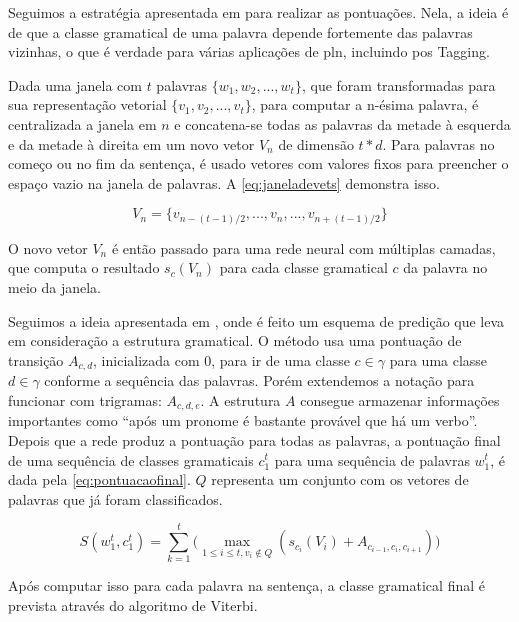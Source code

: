 Seguimos a estratégia apresentada em \cite{dos2014training} para realizar as pontuações. Nela, a ideia é de que a classe gramatical de uma palavra depende fortemente das palavras vizinhas, o que é verdade para várias aplicações de \ac{pln}, incluindo \ac{pos} Tagging.

Dada uma janela com $t$ palavras $\{w_1, w_2, ..., w_t\}$, que foram transformadas para sua representação vetorial $\{v_1, v_2, ..., v_t\}$, para computar a n-ésima palavra, é centralizada a janela em $n$ e concatena-se todas as palavras da metade à esquerda e da metade à direita em um novo vetor $V_n$ de dimensão $t * d$. Para palavras no começo ou no fim da sentença, é usado vetores com valores fixos para preencher o espaço vazio na janela de palavras. A \autoref{eq:janeladevets} demonstra isso.

\begin{equation} \label{eq:janeladevets}
V_n = \big\{ v_{n - (t-1)/2}, ..., v_n, ..., v_{{n + (t-1)/2}} \big\}
\end{equation}

O novo vetor $V_n$ é então passado para uma rede neural com múltiplas camadas, que computa o resultado $s_c(V_n)$ para cada classe gramatical $c$ da palavra no meio da janela. 

Seguimos a ideia apresentada em \cite{collobert2011natural}, onde é feito um esquema de predição que leva em consideração a estrutura gramatical. O método usa uma pontuação de transição $A_{c,d}$, inicializada com 0, para ir de uma classe $c \in \gamma$ para uma classe $d \in \gamma$ conforme a sequência das palavras. Porém extendemos a notação para funcionar com trigramas: $A_{c,d,e}$. A estrutura $A$ consegue armazenar informações importantes como ``após um pronome é bastante provável que há um verbo''. Depois que a rede produz a pontuação para todas as palavras, a pontuação final de uma sequência de classes gramaticais $c_1^t$ para uma sequência de palavras $w_1^t$, é dada pela \autoref{eq:pontuacaofinal}. $Q$ representa um conjunto com os vetores de palavras que já foram classificados.

\begin{equation} \label{eq:pontuacaofinal}
S(w_1^t, c_1^t) = \sum\limits_{k=1}^{t} \Big( \max_{1 \leq i \leq t, v_i \notin Q} (s_{c_i}(V_i) + A_{c_{i-1}, c_{i}, c_{i+1}}) \Big)
\end{equation}

Após computar isso para cada palavra na sentença, a classe gramatical final é prevista através do algoritmo de Viterbi.


